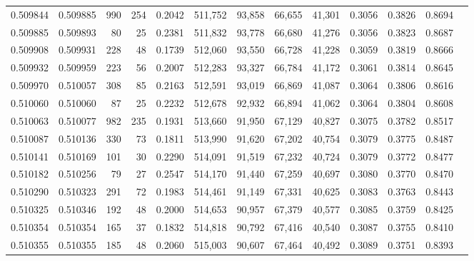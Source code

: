 \begin{tabular}{rrrrrrrrrrrrr}
0.509844 & 0.509885 &   990 &   254 &                                     0.2042 & 511,752 &  93,858 &  66,655 &  41,301 & 0.3056 & 0.3826 & 0.8694 \\
0.509885 & 0.509893 &    80 &    25 &                                     0.2381 & 511,832 &  93,778 &  66,680 &  41,276 & 0.3056 & 0.3823 & 0.8687 \\
0.509908 & 0.509931 &   228 &    48 &                                     0.1739 & 512,060 &  93,550 &  66,728 &  41,228 & 0.3059 & 0.3819 & 0.8666 \\
0.509932 & 0.509959 &   223 &    56 &                                     0.2007 & 512,283 &  93,327 &  66,784 &  41,172 & 0.3061 & 0.3814 & 0.8645 \\
0.509970 & 0.510057 &   308 &    85 &                                     0.2163 & 512,591 &  93,019 &  66,869 &  41,087 & 0.3064 & 0.3806 & 0.8616 \\
0.510060 & 0.510060 &    87 &    25 &                                     0.2232 & 512,678 &  92,932 &  66,894 &  41,062 & 0.3064 & 0.3804 & 0.8608 \\
0.510063 & 0.510077 &   982 &   235 &                                     0.1931 & 513,660 &  91,950 &  67,129 &  40,827 & 0.3075 & 0.3782 & 0.8517 \\
0.510087 & 0.510136 &   330 &    73 &                                     0.1811 & 513,990 &  91,620 &  67,202 &  40,754 & 0.3079 & 0.3775 & 0.8487 \\
0.510141 & 0.510169 &   101 &    30 &                                     0.2290 & 514,091 &  91,519 &  67,232 &  40,724 & 0.3079 & 0.3772 & 0.8477 \\
0.510182 & 0.510256 &    79 &    27 &                                     0.2547 & 514,170 &  91,440 &  67,259 &  40,697 & 0.3080 & 0.3770 & 0.8470 \\
0.510290 & 0.510323 &   291 &    72 &                                     0.1983 & 514,461 &  91,149 &  67,331 &  40,625 & 0.3083 & 0.3763 & 0.8443 \\
0.510325 & 0.510346 &   192 &    48 &                                     0.2000 & 514,653 &  90,957 &  67,379 &  40,577 & 0.3085 & 0.3759 & 0.8425 \\
0.510354 & 0.510354 &   165 &    37 &                                     0.1832 & 514,818 &  90,792 &  67,416 &  40,540 & 0.3087 & 0.3755 & 0.8410 \\
0.510355 & 0.510355 &   185 &    48 &                                     0.2060 & 515,003 &  90,607 &  67,464 &  40,492 & 0.3089 & 0.3751 & 0.8393 \\

\end{tabular}
